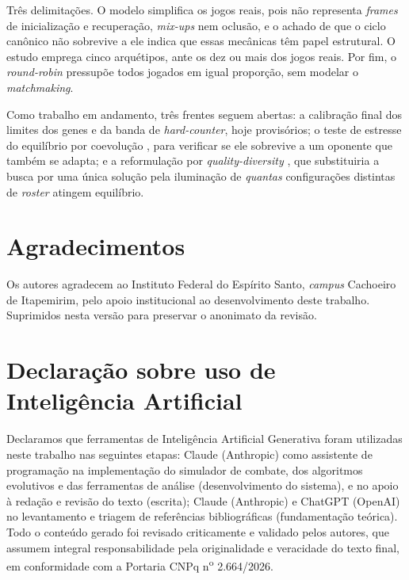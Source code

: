 \documentclass[10pt,conference]{IEEEtran}
\begin{document}
Três delimitações. O modelo simplifica os jogos reais, pois não representa
\emph{frames} de inicialização e recuperação, \emph{mix-ups} nem oclusão, e o
achado de que o ciclo canônico não sobrevive a ele indica que essas mecânicas têm
papel estrutural. O estudo emprega cinco arquétipos, ante os dez ou mais dos jogos
reais. Por fim, o \emph{round-robin} pressupõe todos jogados em igual proporção, sem
modelar o \emph{matchmaking}.

Como trabalho em andamento, três frentes seguem abertas: a calibração final dos
limites dos genes e da banda de \emph{hard-counter}, hoje provisórios; o teste de
estresse do equilíbrio por coevolução \cite{chen2014mmorpg}, para verificar se ele
sobrevive a um oponente que também se adapta; e a reformulação por
\emph{quality-diversity} \cite{mouret2015mapelites}, que substituiria a busca por
uma única solução pela iluminação de \emph{quantas} configurações distintas de
\emph{roster} atingem equilíbrio.

\section*{Agradecimentos}

\iffinal
Os autores agradecem ao Instituto Federal do Espírito Santo, \emph{campus}
Cachoeiro de Itapemirim, pelo apoio institucional ao desenvolvimento deste
trabalho.
\else
Suprimidos nesta versão para preservar o anonimato da revisão.
\fi

\section*{Declaração sobre uso de Inteligência Artificial}

Declaramos que ferramentas de Inteligência Artificial Generativa foram utilizadas
neste trabalho nas seguintes etapas: Claude (Anthropic) como assistente de
programação na implementação do simulador de combate, dos algoritmos evolutivos e
das ferramentas de análise (desenvolvimento do sistema), e no apoio à redação e
revisão do texto (escrita); Claude (Anthropic) e ChatGPT (OpenAI) no levantamento e
triagem de referências bibliográficas (fundamentação teórica). Todo o conteúdo
gerado foi revisado criticamente e validado pelos autores,
que assumem integral responsabilidade pela originalidade e veracidade do texto
final, em conformidade com a Portaria CNPq n\textsuperscript{o} 2.664/2026.



\end{document}
